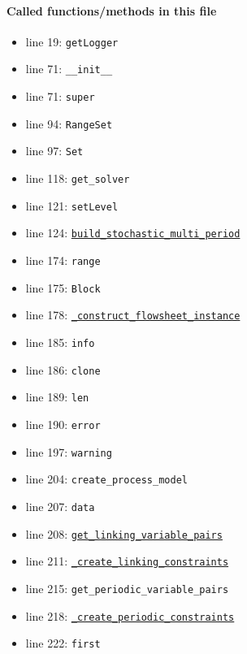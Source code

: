 \documentclass[11pt]{report}
\begin{document}
\paragraph{Called functions/methods in this file}
\begin{itemize}[leftmargin=*]
  \item line 19: \texttt{getLogger}
  \item line 71: \texttt{\_\_init\_\_}
  \item line 71: \texttt{super}
  \item line 94: \texttt{RangeSet}
  \item line 97: \texttt{Set}
  \item line 118: \texttt{get\_solver}
  \item line 121: \texttt{setLevel}
  \item line 124: \hyperref[def:multiperiod-multiperiod.py:MultiPeriodModel.build_stochastic_multi_period:L351]{\texttt{build\_stochastic\_multi\_period}}
  \item line 174: \texttt{range}
  \item line 175: \texttt{Block}
  \item line 178: \hyperref[def:multiperiod-multiperiod.py:MultiPeriodModel._construct_flowsheet_instance:L315]{\texttt{\_construct\_flowsheet\_instance}}
  \item line 185: \texttt{info}
  \item line 186: \texttt{clone}
  \item line 189: \texttt{len}
  \item line 190: \texttt{error}
  \item line 197: \texttt{warning}
  \item line 204: \texttt{create\_process\_model}
  \item line 207: \texttt{data}
  \item line 208: \hyperref[def:multiperiod-tests-test_multiperiod.py:get_linking_variable_pairs:L58]{\texttt{get\_linking\_variable\_pairs}}
  \item line 211: \hyperref[def:multiperiod-multiperiod.py:MultiPeriodModel._create_linking_constraints:L299]{\texttt{\_create\_linking\_constraints}}
  \item line 215: \texttt{get\_periodic\_variable\_pairs}
  \item line 218: \hyperref[def:multiperiod-multiperiod.py:MultiPeriodModel._create_periodic_constraints:L307]{\texttt{\_create\_periodic\_constraints}}
  \item line 222: \texttt{first}

\end{itemize}
\end{document}

